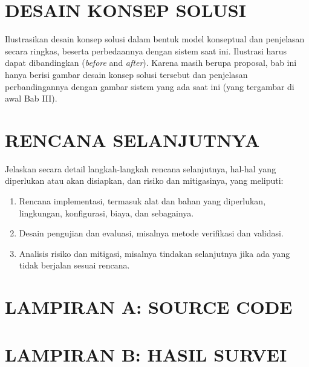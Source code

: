 \documentclass[12pt,a4paper,oneside]{book}
\begin{document}
\chapter{DESAIN KONSEP SOLUSI}
Ilustrasikan desain konsep solusi dalam bentuk model konseptual dan penjelasan secara ringkas, 
beserta perbedaannya dengan sistem saat ini. Ilustrasi harus dapat dibandingkan (\textit{before} and \textit{after}). 
Karena masih berupa proposal, bab ini hanya berisi gambar desain konsep solusi tersebut dan 
penjelasan perbandingannya dengan gambar sistem yang ada saat ini (yang tergambar di awal Bab III).

\chapter{RENCANA SELANJUTNYA}
Jelaskan secara detail langkah-langkah rencana selanjutnya, hal-hal yang diperlukan atau akan disiapkan, dan risiko dan mitigasinya, yang meliputi:
\begin{enumerate}
\item	Rencana implementasi, termasuk alat dan bahan yang diperlukan, lingkungan, konfigurasi, biaya, dan sebagainya.
\item	Desain pengujian dan evaluasi, misalnya metode verifikasi dan validasi.
\item	Analisis risiko dan mitigasi, misalnya tindakan selanjutnya jika ada yang tidak berjalan sesuai rencana.
\end{enumerate}


\backmatter

\printbibliography[title={DAFTAR PUSTAKA}]

\appendix

\chapter{LAMPIRAN A: SOURCE CODE}

\chapter{LAMPIRAN B: HASIL SURVEI}
\end{document}
